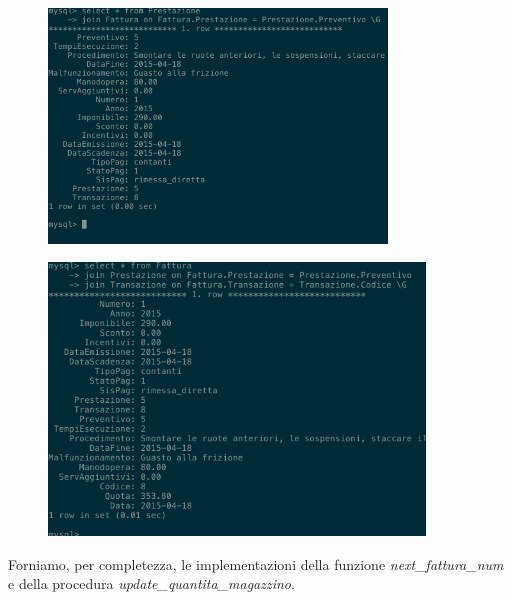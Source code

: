         \begin{figure}[H]
          \centering
          \includegraphics[width=9cm]{images/screenshots/nuova_prestazione_4.png}
        \end{figure}
        \begin{figure}[H]
          \centering
          \includegraphics[width=10cm]{images/screenshots/nuova_prestazione_5.png}
        \end{figure}

        Forniamo, per completezza, le implementazioni della funzione \emph{next\_fattura\_num} e della procedura \emph{update\_quantita\_magazzino}.

